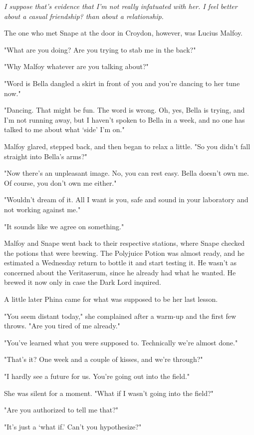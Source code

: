 \emph{I suppose that's evidence that I'm not really infatuated with her. I feel better about a casual{\el} friendship? than about a relationship.}

The one who met Snape at the door in Croydon, however, was Lucius Malfoy.

"What are you doing? Are you trying to stab me in the back?"

"Why Malfoy{\el} whatever are you talking about?"

"Word is Bella dangled a skirt in front of you and you're dancing to her tune now."

"Dancing. That might be fun. The word is wrong. Oh, yes, Bella is trying, and I'm not running away, but I haven't spoken to Bella in a week, and no one has talked to me about what `side' I'm on."

Malfoy glared, stepped back, and then began to relax a little. "So you didn't fall straight into Bella's arms?"

"Now there's an unpleasant image. No, you can rest easy. Bella doesn't own me. Of course, you don't own me either."

"Wouldn't dream of it. All I want is you, safe and sound in your laboratory and not working against me."

"It sounds like we agree on something."

Malfoy and Snape went back to their respective stations, where Snape checked the potions that were brewing. The Polyjuice Potion was almost ready, and he estimated a Wednesday return to bottle it and start testing it. He wasn't as concerned about the Veritaserum, since he already had what he wanted. He brewed it now only in case the Dark Lord inquired.

A little later Phina came for what was supposed to be her last lesson.

"You seem distant today," she complained after a warm-up and the first few throws. "Are you tired of me already."

"You've learned what you were supposed to. Technically we're almost done."

"That's it? One week and a couple of kisses, and we're through?"

"I hardly see a future for us. You're going out into the field."

She was silent for a moment. "What if I wasn't going into the field?"

"Are you authorized to tell me that?"

"It's just a `what if.' Can't you hypothesize?"

